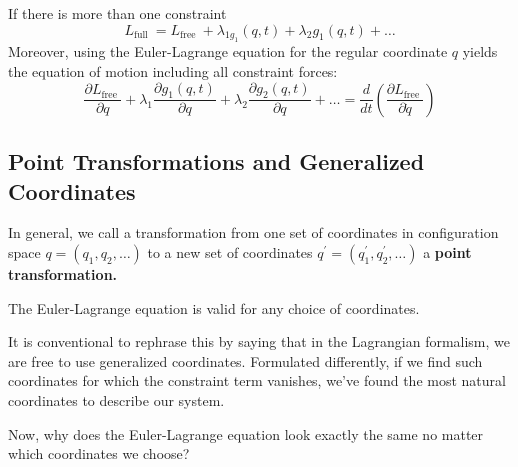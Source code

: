 If there is more than one constraint
$$
L_{\text {full }}=L_{\text {free }}+\lambda_{1 g_{1}}(q, t)+\lambda_{2} g_{1}(q, t)+\ldots
$$
Moreover, using the Euler-Lagrange equation for the regular coordinate $q$ yields the equation of motion including all constraint forces:
$$
\frac{\partial L_{\text {free }}}{\partial q}+\lambda_{1} \frac{\partial g_{1}(q, t)}{\partial q}+\lambda_{2} \frac{\partial g_{2}(q, t)}{\partial q}+\ldots=\frac{d}{d t}\left(\frac{\partial L_{\text {free }}}{\partial \dot{q}}\right)
$$

\subsection{Point Transformations and Generalized Coordinates}
In general, we call a transformation from one set of coordinates in configuration space $q=\left(q_{1}, q_{2}, \ldots\right)$ to a new set of coordinates $q^{\prime}=\left(q_{1}^{\prime}, q_{2}^{\prime}, \ldots\right)$ a\textbf{ point transformation.}
\begin{qt}
\begin{center}
    The Euler-Lagrange equation is valid for any choice of coordinates.
\end{center}
\end{qt}
It is conventional to rephrase this by saying that in the Lagrangian formalism, we are free to use generalized coordinates. Formulated differently, if we find such coordinates for which the constraint term vanishes, we’ve found the most natural coordinates to describe our system.
\begin{mybox}
\begin{center}
    Now, why does the Euler-Lagrange equation look exactly the same no matter which coordinates we choose?
\end{center}
\end{mybox}

